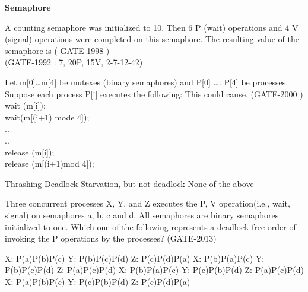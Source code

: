 \centerline{\textbf{ \LARGE Semaphore }}



\begin{questyle}

  \question  A counting semaphore was initialized to 10. Then 6 P (wait) operations and 4 V (signal) operations were completed on this semaphore. The resulting value of the semaphore is ( GATE-1998 )
  \\ (GATE-1992 :  7, 20P, 15V, 2-7-12-42)
  \begin{choices}
  \end{choices}

  \end{questyle}


\begin{questyle}

  \question   Let m[0]…m[4] be mutexes (binary semaphores) and P[0] …. P[4] be processes.
              Suppose each process P[i] executes the following: This could cause. (GATE-2000 ) \\
              wait (m[i]); \\
              wait(m[(i+1) mode 4]); \\
              ..\\
              ..\\
              release (m[i]);\\
              release (m[(i+1)mod 4]);

  \begin{oneparchoices}
    \choice Thrashing
    \correctchoice Deadlock
    \choice Starvation, but not deadlock
    \choice None of the above
  \end{oneparchoices}

  \end{questyle}



\begin{questyle}

  \question Three concurrent processes X, Y, and Z  executes the P, V operation(i.e., wait, signal)
            on semaphores a, b, c and d. All semaphores are binary semaphores initialized to one.
            Which one of the following represents a deadlock-free order of invoking the P operations
            by the processes? (GATE-2013)

  \begin{choices}
    \choice         X: P(a)P(b)P(c) \qquad  Y: P(b)P(c)P(d) \qquad  Z: P(c)P(d)P(a)
    \correctchoice  X: P(b)P(a)P(c) \qquad  Y: P(b)P(c)P(d) \qquad  Z: P(a)P(c)P(d)
    \choice         X: P(b)P(a)P(c) \qquad  Y: P(c)P(b)P(d) \qquad  Z: P(a)P(c)P(d)
    \choice         X: P(a)P(b)P(c) \qquad  Y: P(c)P(b)P(d) \qquad  Z: P(c)P(d)P(a)
  \end{choices}

  \end{questyle}



